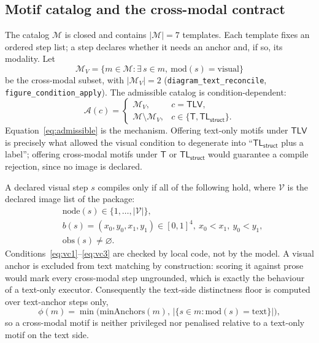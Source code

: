 \documentclass[conference]{IEEEtran}
\newcommand{\T}{\mathsf{T}}
\newcommand{\TL}{\mathsf{TL_{struct}}}
\newcommand{\TLV}{\mathsf{TLV}}
\begin{document}
\subsection{Motif catalog and the cross-modal contract}
The catalog $\mathcal{M}$ is closed and contains $|\mathcal{M}|=7$ templates. Each
template fixes an ordered step list; a step declares whether it needs an anchor and,
if so, its modality. Let
\begin{equation}
\mathcal{M}_{V}=\{m\in\mathcal{M}: \exists\, s\in m,\ \mathrm{mod}(s)=\text{visual}\}
\end{equation}
be the cross-modal subset, with $|\mathcal{M}_V|=2$
(\texttt{diagram\_text\_reconcile}, \texttt{figure\_condition\_apply}). The
admissible catalog is condition-dependent:
\begin{equation}
\mathcal{A}(c)=
\begin{cases}
\mathcal{M}_V, & c=\TLV,\\
\mathcal{M}\setminus\mathcal{M}_V, & c\in\{\T,\TL\}.
\end{cases}
\label{eq:admissible}
\end{equation}
Equation~\eqref{eq:admissible} is the mechanism. Offering text-only motifs under
$\TLV$ is precisely what allowed the visual condition to degenerate into
``$\TL$ plus a label''; offering cross-modal motifs under $\T$ or $\TL$ would
guarantee a compile rejection, since no image is declared.

A declared visual step $s$ compiles only if all of the following hold, where
$\mathcal{V}$ is the declared image list of the package:
\begin{align}
&\mathrm{node}(s)\in\{1,\dots,|\mathcal{V}|\}, \label{eq:vc1}\\
&b(s)=(x_0,y_0,x_1,y_1)\in[0,1]^4,\ x_0<x_1,\ y_0<y_1, \label{eq:vc2}\\
&\mathrm{obs}(s)\neq\varnothing. \label{eq:vc3}
\end{align}
Conditions~\eqref{eq:vc1}--\eqref{eq:vc3} are checked by local code, not by the
model. A visual anchor is excluded from text matching by construction: scoring it
against prose would mark every cross-modal step ungrounded, which is exactly the
behaviour of a text-only executor. Consequently the text-side distinctness floor
is computed over text-anchor steps only,
\begin{equation}
\phi(m)=\min\bigl(\mathrm{minAnchors}(m),\,|\{s\in m:\mathrm{mod}(s)=\text{text}\}|\bigr),
\end{equation}
so a cross-modal motif is neither privileged nor penalised relative to a text-only
motif on the text side.
\end{document}
